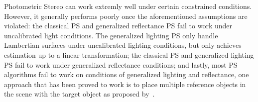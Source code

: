 Photometric Stereo can work extremly well under certain constrained conditions. However, it generally performs poorly once the aforementioned assumptions are violated: the classical PS and generalized reflectance PS fail to work under uncalibrated light conditions. The generalized lighting PS only handle Lambertian surfaces under uncalibrated lighting conditions, but only achieves estimation up to a linear transformation; the classical PS and generalized lighting PS fail to work under generalized reflectance conditions; and lastly, most PS algorithms fail to work on conditions of generalized lighting and reflectance, one approach that has been proved to work is to place multiple reference objects in the scene with the target object as proposed by~\cite{hertzmann2005example}.





